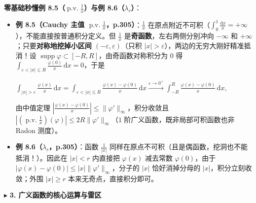 \documentclass[11pt,a4paper]{article}
\providecommand{\tightlist}{\setlength{\itemsep}{2pt}\setlength{\parskip}{0pt}}
\newcommand{\SubSubHeading}[1]{%
  \Needspace{6.5\baselineskip}\vspace{5.5pt}\noindent
  \textcolor{AccentMain}{\scriptsize$\blacktriangleright$}\hspace{4pt}%
  {\small\bfseries\color{AccentMain}#1}\par\nopagebreak[4]\vspace{2.5pt}%
}
\renewenvironment{quote}{%
  \begin{tcolorbox}[
    enhanced,
    breakable,
    colback=AccentSoft!48!white,
    colframe=AccentMain,
    boxrule=0pt,
    leftrule=2.8pt,
    arc=2.5pt,
    left=9pt, right=8pt, top=6pt, bottom=6pt,
    before skip=5.5pt, after skip=5.5pt
  ]\small
}{%
  \end{tcolorbox}%
}
\newcommand{\FitDisplayMath}[1]{%
  \par\vspace{4.5pt}\noindent
  \begin{adjustbox}{max width=\linewidth, center}
    $\displaystyle #1$
  \end{adjustbox}
  \par\vspace{4.5pt}%
}
\begin{document}
\begin{quote}
\textbf{零基础秒懂例 8.5（\(\operatorname{p.v.}\frac{1}{x}\)）与例 8.6（\(\lambda_r\)）}：

\begin{itemize}
\tightlist
\item
  \textbf{例 8.5（Cauchy 主值 \(\operatorname{p.v.}\frac{1}{x}\)，p.305）}：\(\frac{1}{x}\) 在原点附近不可积（\(\int_0^1 \frac{\mathrm{d}x}{x} = +\infty\)），不能直接按普通积分定义。但 \(\frac{1}{x}\) 是\textbf{奇函数}，左右两侧分别冲向 \(-\infty\) 和 \(+\infty\)；只要\textbf{对称地挖掉小区间 \((-\varepsilon, \varepsilon)\)}（只积 \(|x|>\varepsilon\)），两边的无穷大刚好精准抵消！设 \(\operatorname{supp}\varphi \subset [-R, R]\)，由奇函数对称积分为 \(0\) 得 \(\int_{\varepsilon<|x|\le R}\frac{\varphi(0)}{x}\,\mathrm{d}x = 0\)，于是 
\FitDisplayMath{\int_{|x|>\varepsilon}\frac{\varphi(x)}{x}\,\mathrm{d}x = \int_{\varepsilon<|x|\le R}\frac{\varphi(x)-\varphi(0)}{x}\,\mathrm{d}x \xrightarrow{\varepsilon\to 0^+} \int_{-R}^{R}\frac{\varphi(x)-\varphi(0)}{x}\,\mathrm{d}x,}
 由中值定理 \(\left|\frac{\varphi(x)-\varphi(0)}{x}\right| \le \|\varphi'\|_\infty\)，积分收敛且 \(\left|\left(\operatorname{p.v.}\frac{1}{x}\right)(\varphi)\right| \le 2R\|\varphi'\|_\infty\)（\(1\) 阶广义函数，既非局部可积函数也非 Radon 测度）。
\item
  \textbf{例 8.6（\(\lambda_r\)，p.305）}：函数 \(\frac{1}{|x|}\) 同样在原点不可积（且是偶函数，挖洞也不能抵消！）。因此在 \(|x|<r\) 内直接把 \(\varphi(x)\) 减去常数 \(\varphi(0)\)，由于 \(|\varphi(x)-\varphi(0)| \le |x|\|\varphi'\|_\infty\)，分子的 \(|x|\) 恰好消掉分母的 \(|x|\)，积分立刻收敛；外围 \(|x|\ge r\) 本来无奇点，直接积分即可。
\end{itemize}
\end{quote}

\SubSubHeading{3. 广义函数的核心运算与雷区}
\end{document}
